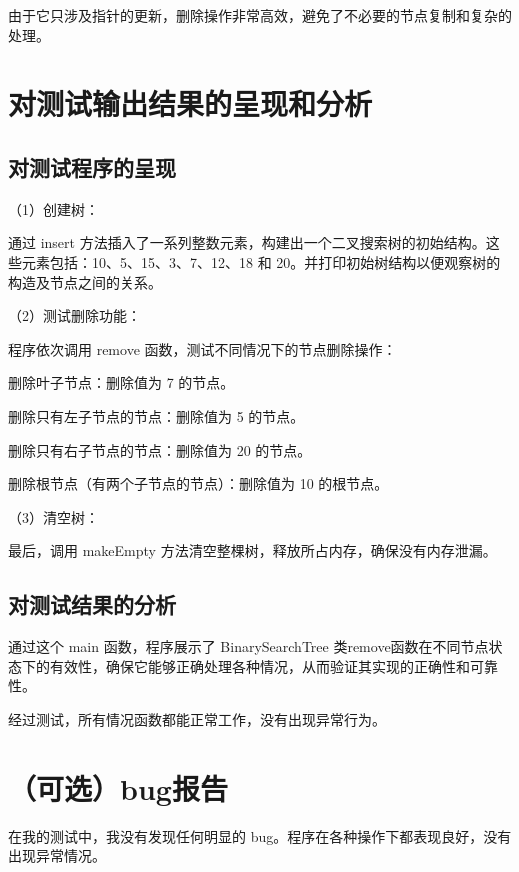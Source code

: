 \documentclass[UTF8]{ctexart}
\begin{document}
由于它只涉及指针的更新，删除操作非常高效，避免了不必要的节点复制和复杂的处理。


\section{对测试输出结果的呈现和分析}

\subsection{对测试程序的呈现}

（1）创建树：

通过 insert 方法插入了一系列整数元素，构建出一个二叉搜索树的初始结构。这些元素包括：10、5、15、3、7、12、18 和 20。并打印初始树结构以便观察树的构造及节点之间的关系。

（2）测试删除功能：

程序依次调用 remove 函数，测试不同情况下的节点删除操作：

删除叶子节点：删除值为 7 的节点。

删除只有左子节点的节点：删除值为 5 的节点。

删除只有右子节点的节点：删除值为 20 的节点。

删除根节点（有两个子节点的节点）：删除值为 10 的根节点。

（3）清空树：

最后，调用 makeEmpty 方法清空整棵树，释放所占内存，确保没有内存泄漏。

\subsection{对测试结果的分析}

通过这个 main 函数，程序展示了 BinarySearchTree 类remove函数在不同节点状态下的有效性，确保它能够正确处理各种情况，从而验证其实现的正确性和可靠性。

 
经过测试，所有情况函数都能正常工作，没有出现异常行为。


\section{（可选）bug报告}

在我的测试中，我没有发现任何明显的 bug。程序在各种操作下都表现良好，没有出现异常情况。
\end{document}
